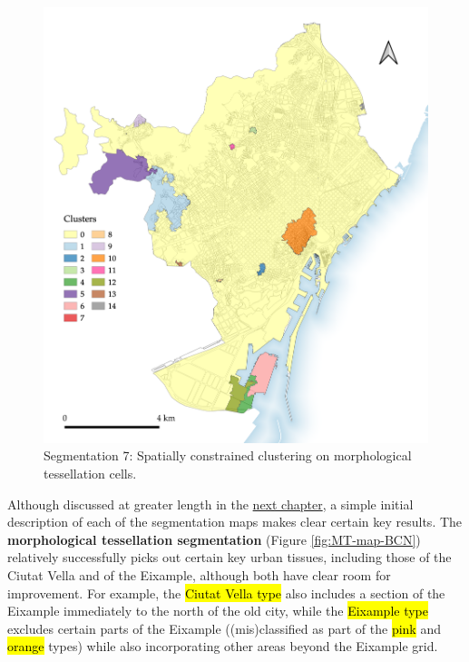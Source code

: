 \documentclass[a4paper, nobind]{templates/ociamthesis}
\begin{document}
\begin{figure}

{\centering \includegraphics[width=.8\paperwidth]{figures/maps/MT_constrained_15cls_5sw 1} 

}

\caption[Segmentation 7: Spatially constrained MT clustering.]{Segmentation 7: Spatially constrained clustering on morphological tessellation cells.}\label{fig:constrained-map-BCN}
\end{figure}

Although discussed at greater length in the \protect\hyperlink{creating-spatial-segmentations-to-reflect-urban-morphology}{next chapter}, a simple initial description of each of the segmentation maps makes clear certain key results. The \textbf{morphological tessellation segmentation} (Figure \ref{fig:MT-map-BCN}) relatively successfully picks out certain key urban tissues, including those of the Ciutat Vella and of the Eixample, although both have clear room for improvement. For example, the \hl{Ciutat Vella type} also includes a section of the Eixample immediately to the north of the old city, while the \hl{Eixample type} excludes certain parts of the Eixample ((mis)classified as part of the \hl{pink} and \hl{orange} types) while also incorporating other areas beyond the Eixample grid.
\end{document}
